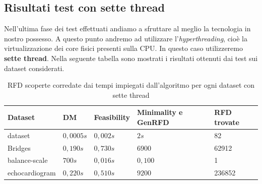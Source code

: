 \subsection{Risultati test con sette thread}
Nell'ultima fase dei test effettuati andiamo a sfruttare al meglio la tecnologia in nostro possesso.
A questo punto andremo ad utilizzare l'\emph{hyperthreading}, cioè la virtualizzazione dei core fisici presenti sulla CPU. In questo caso utilizzeremo \textbf{sette thread}.
Nella seguente tabella sono mostrati i risultati ottenuti dai test sui dataset considerati.
\begin{table}[H]
	\centering
	\begin{tabular}{lllll}
		Dataset & DM & Feasibility & Minimality e GenRFD & RFD trovate \\
		\hline
		dataset& $0,0005s$ & $0,002s$& $2s$  & 82 \\
		Bridges & $0,190s$  & $0,730s$ & $6900$ & 62912 \\
		balance-scale  & $700s$  & $0,016s$ & $0,100$ & 1\\
		echocardiogram  & $0,220s$  & $0,510s$ & $9200$ & 236852\\
		\hline
	\end{tabular}
	\label{risultati_7_thread}
	\caption{RFD scoperte corredate dai tempi impiegati dall'algoritmo per ogni dataset con sette thread}
\end{table}
